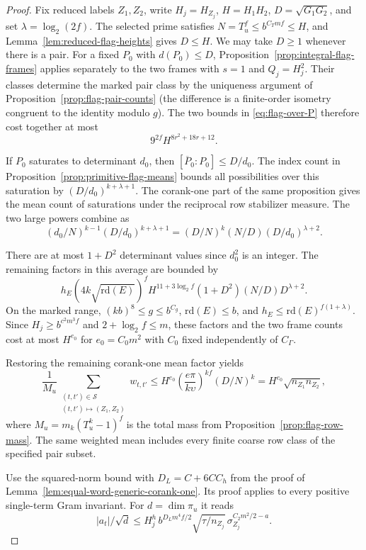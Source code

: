 \begin{proof}
Fix reduced labels \(Z_1,Z_2\), write \(H_j=H_{Z_j}\),
\(H=H_1H_2\), \(D=\sqrt{G_1G_2}\), and set \(\lambda=\log_2(2f)\).
The selected prime satisfies \(N=T_u^f\le b^{C_T mf}\le H\),
and Lemma~\ref{lem:reduced-flag-heights} gives \(D\le H\). We may take \(D\ge1\)
whenever there is a pair. For a fixed \(P_0\) with \(d(P_0)\le D\),
Proposition~\ref{prop:integral-flag-frames} applies separately to
the two frames with \(s=1\) and \(Q_j=H_j^2\).
Their classes determine the marked pair class by the uniqueness
argument of Proposition~\ref{prop:flag-pair-counts} (the difference
is a finite-order isometry congruent to the identity modulo \(g\)).
The two bounds in \eqref{eq:flag-over-P} therefore cost together
at most
\[
             9^{2f}H^{8r^2+18r+12}.
\]

If \(P_0\) saturates to determinant \(d_0\), then
\([\overline P_0:P_0]\le D/d_0\). The index count in
Proposition~\ref{prop:primitive-flag-means} bounds all possibilities
over this saturation by \((D/d_0)^{k+\lambda+1}\).
The corank-one part of the same proposition gives the mean count
of saturations under the reciprocal row stabilizer measure.
The two large powers combine as
\[
 (d_0/N)^{k-1}(D/d_0)^{k+\lambda+1}
    =(D/N)^k(N/D)(D/d_0)^{\lambda+2}.
\]

There are at most \(1+D^2\) determinant values since \(d_0^2\)
is an integer. The remaining factors in this average are bounded by
\[
  h_E(4k\sqrt{\mathrm{rd}(E)})^f
        H^{11+3\log_2 f}(1+D^2)(N/D)D^{\lambda+2}.
\]
On the marked range, \((kb)^8\le g\le b^{C_g}\),
\(\mathrm{rd}(E)\le b\), and
\(h_E\le\mathrm{rd}(E)^{f(1+\lambda)}\).
Since \(H_j\ge b^{c^2m^3 f}\) and \(2+\log_2 f\le m\), these
factors and the two frame counts cost at most \(H^{e_0}\) for
\(e_0=C_0m^2\) with \(C_0\) fixed independently of \(C_\Gamma\).

Restoring the remaining corank-one mean factor yields
\[
 \frac{1}{M_u}\sum_{\substack{(t,t')\in\mathcal S\\
                     (t,t')\mapsto(Z_1,Z_2)}}w_{t,t'}
 \le H^{e_0}\left(\frac{e\pi}{k\upsilon}\right)^{kf}
                  (D/N)^k
     = H^{e_0}\sqrt{n_{Z_1}n_{Z_2}},
\]
where \(M_u=m_k(T_u^k-1)^f\)
is the total mass from Proposition~\ref{prop:flag-row-mass}.
The same weighted mean includes every finite coarse row class
of the specified pair subset.

Use the squared-norm bound with \(D_L=C+6CC_h\) from the proof of
Lemma~\ref{lem:equal-word-generic-corank-one}. Its proof applies to
every positive single-term Gram invariant. For \(d=\dim\pi_u\) it reads
\[
 |a_t|/\sqrt d
 \le H_j^h\,b^{D_Lm^4 f/2}\sqrt{\tau/n_{Z_j}}\,
                         \sigma_{Z_j}^{C_2m^2/2-a}.
\]


\end{proof}
